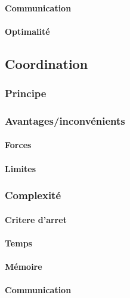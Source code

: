 \documentclass[a4paper, 10pt]{article}
\begin{document}
\paragraph{Communication}

\paragraph{Optimalité}

\subsection{Coordination}

\subsubsection{Principe}

\subsubsection{Avantages/inconvénients}

\paragraph{Forces}

\paragraph{Limites}

\subsubsection{Complexité}

\paragraph{Critere d'arret}

\paragraph{Temps}

\paragraph{Mémoire}

\paragraph{Communication}
\end{document}
